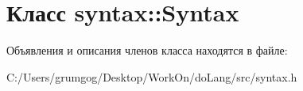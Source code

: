 \hypertarget{classsyntax_1_1_syntax}{}\section{Класс syntax\+:\+:Syntax}
\label{classsyntax_1_1_syntax}


Объявления и описания членов класса находятся в файле\+:\begin{DoxyCompactItemize}
\item 
C\+:/\+Users/grumgog/\+Desktop/\+Work\+On/do\+Lang/src/syntax.\+h\end{DoxyCompactItemize}
